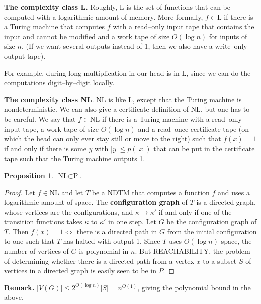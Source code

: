 \documentclass{article}
\theoremstyle{definition}
\newtheorem{prop}[theorem]{Proposition}
\begin{document}
\textbf{The complexity class L.} Roughly, $\text{L}$ is the set of functions that can be computed with a logarithmic amount of memory. More formally, $f \in \text{L}$ if there is a Turing machine that computes $f$ with a read--only input tape that contains the input and cannot be modified and a work tape of size $O(\log n)$ for inputs of size $n$. (If we want several outputs instead of 1, then we also have a write--only output tape).
\vspace{1mm}
 
For example, during long multiplication in our head is in $\text{L}$, since we can do the computations digit--by--digit locally.
\vspace{1mm}

\textbf{The complexity class NL}. $\text{NL}$ is like $\text{L}$, except that the Turing machine is nondeterministic. We can also give a certificate definition of $\text{NL}$, but one has to be careful. We say that $f \in \text{NL}$ if there is a Turing machine with a read--only input tape, a work tape of size $O(\log n)$ and a read--once certificate tape (on which the head can only ever stay still or move to the right) such that $f(x)=1$ if and only if there is some $y$ with $\left|y\right|\le p(\left|x\right|)$ that can be put in the certificate tape such that the Turing machine outputs 1.

\begin{prop}
    $\text{NL} \subset \text{P}$.
\end{prop}
\begin{proof}
    Let $f  \in \text{NL}$ and let $T$ be a NDTM that computes a function $f$ and uses a logarithmic amount of space. The \textbf{configuration graph} of $T$ is a directed graph, whose vertices are the configurations, and $\kappa \to \kappa'$ if and only if one of the transition functions takes $\kappa$ to $\kappa'$ in one step. Let $G$ be the configuration graph of $T$. Then $f(x)=1 \iff$ there is a directed path in $G$ from the initial configuration to one such that $T$ has halted with output 1. Since $T$ uses $O(\log n)$ space, the number of vertices of $G$ is polynomial in $n$. But REACHABILITY, the problem of determining whether there is a directed path from a vertex $x$ to a subset $S$ of vertices in a directed graph is easily seen to be in $P$. 
\end{proof}
\textbf{Remark.} $\left|V(G)\right|\le 2^{O(\log n)}\left|S\right|=n^{O(1)}$, giving the polynomial bound in the above.
\end{document}
